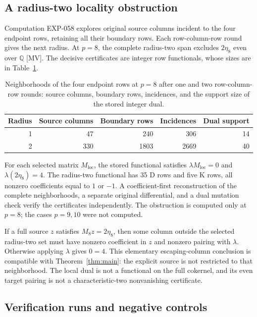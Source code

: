 \documentclass[11pt]{article}
\theoremstyle{definition}
\theoremstyle{remark}
\begin{document}
\subsection{A radius-two locality obstruction}

Computation EXP-058 explores original source columns
incident to the four endpoint rows, retaining all their boundary rows.
Each row-column-row round gives the next radius. At $p=8$, the complete
radius-two span excludes $2\eta_8$ even over $\mathbb Q$ [MV].
The decisive certificates are integer row functionals, whose sizes are in
Table~\ref{tab:radius}.
\begin{table}[t]
\centering
\begin{tabular}{rrrrr}
\toprule
Radius & Source columns & Boundary rows & Incidences & Dual support\\
\midrule
1 & 47 & 240 & 306 & 14\\
2 & 330 & 1803 & 2669 & 40\\
\bottomrule
\end{tabular}
\caption{Neighborhoods of the four endpoint rows at $p=8$ after one and two row-column-row rounds:
source columns, boundary rows, incidences, and the support size of the stored integer dual.}
\label{tab:radius}
\end{table}
For each selected matrix $M_{\mathrm{loc}}$, the stored functional satisfies
$\lambda M_{\mathrm{loc}}=0$ and $\lambda(2\eta_8)=4$.
The radius-two functional has 35 D rows and five K rows, all nonzero
coefficients equal to $1$ or $-1$. A coefficient-first reconstruction of
the complete neighborhoods, a separate original differential, and a dual
mutation check verify the certificates independently. The obstruction is
computed only at $p=8$; the cases $p=9,10$ were not computed.

If a full source $z$ satisfies $M_8z=2\eta_8$, then some column outside
the selected radius-two set must have nonzero coefficient in $z$ and
nonzero pairing with $\lambda$. Otherwise applying $\lambda$ gives
$0=4$. This elementary escaping-column conclusion is compatible with
Theorem~\ref{thm:main}: the explicit source is not restricted to that
neighborhood. The local dual is not a functional on the full cokernel,
and its even target pairing is not a characteristic-two nonvanishing
certificate.

\subsection{Verification runs and negative controls}
\end{document}
